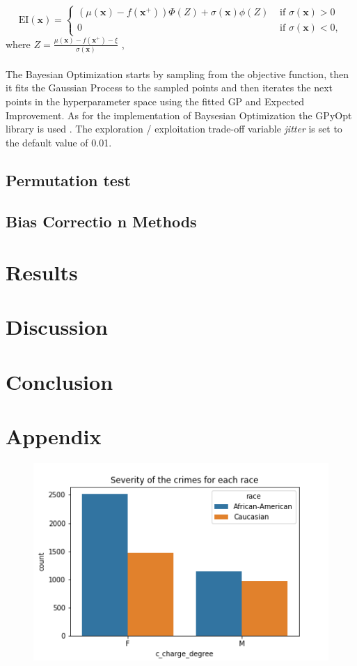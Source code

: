 \documentclass[11pt, fleqn, titlepage]{article}
\begin{document}
	\begin{equation*}
	\mathrm{EI}(\mathbf{x})=\left\{\begin{array}{ll}
	\left(\mu(\mathbf{x})-f\left(\mathbf{x}^{+}\right)\right) \Phi(Z)+\sigma(\mathbf{x}) \phi(Z) & \text { if } \sigma(\mathbf{x})>0 \\
	0 & \text { if } \sigma(\mathbf{x})<0,
	\end{array}\right. 
	\end{equation*}
	where $ Z = \frac{\mu(\mathbf{x}) - f(\mathbf{x}^+) - \xi }{\sigma(\mathbf{x})}$ , \cite{aktiv_bo} 
	\\\\
	The Bayesian Optimization starts by sampling from the objective function, then it fits the Gaussian Process to the sampled points and then iterates the next points in the hyperparameter space using the fitted GP and Expected Improvement. As for the implementation of Baysesian Optimization the GPyOpt library is used \cite{bo_lib}. The exploration / exploitation trade-off variable \textit{jitter} is set to the default value of 0.01.
	
	\subsection{Permutation test}
	
	\subsection{Bias Correctio	n Methods}
	
	\section{Results}
	
	
	\section{Discussion}
	
	
	\section{Conclusion}
	
	\section{Appendix}
	
	\begin{figure}[H]
		\centering
		\includegraphics[width=0.5\linewidth]{imgs/c_charge_degree}
		\caption{}
		\label{fig:cchargedegree}
	\end{figure}
	
\end{document}
